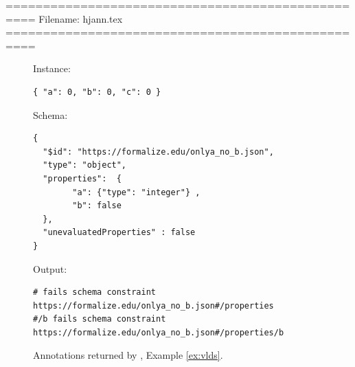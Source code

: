 ==================================================
Filename: hjann.tex
==================================================
\begin{figure}
\small
Instance:
\begin{querybox}{}
\begin{lstlisting}[style=querynonumbers]
{ "a": 0, "b": 0, "c": 0 }
\end{lstlisting}
\end{querybox}

Schema:
\begin{querybox}{}
\begin{lstlisting}[style=query]
{
  "$id": "https://formalize.edu/onlya_no_b.json",
  "type": "object",
  "properties":  { 
        "a": {"type": "integer"} ,
        "b": false
  },
  "unevaluatedProperties" : false
}
\end{lstlisting}
\end{querybox}

Output:
\begin{querybox}{}
\begin{lstlisting}[style=query]
# fails schema constraint https://formalize.edu/onlya_no_b.json#/properties
#/b fails schema constraint https://formalize.edu/onlya_no_b.json#/properties/b
\end{lstlisting}
\end{querybox}
\caption{Annotations returned by {\HJ}, Example \ref{ex:vlds}.}
\label{fig:hjann}
\end{figure}




